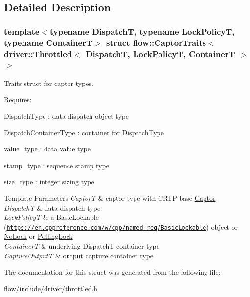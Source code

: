 \subsection{Detailed Description}
\subsubsection*{template$<$typename DispatchT, typename Lock\+PolicyT, typename ContainerT$>$\newline
struct flow\+::\+Captor\+Traits$<$ driver\+::\+Throttled$<$ Dispatch\+T, Lock\+Policy\+T, Container\+T $>$ $>$}

Traits struct for captor types. 

Requires\+:
\begin{DoxyItemize}
\item {\ttfamily Dispatch\+Type} \+: data dispatch object type
\item {\ttfamily Dispatch\+Container\+Type} \+: container for {\ttfamily Dispatch\+Type}
\item {\ttfamily value\+\_\+type} \+: data value type
\item {\ttfamily stamp\+\_\+type} \+: sequence stamp type
\item {\ttfamily size\+\_\+type} \+: integer sizing type
\end{DoxyItemize}


\begin{DoxyTemplParams}{Template Parameters}
{\em CaptorT} & captor type with C\+R\+TP base {\ttfamily \hyperlink{classflow_1_1_captor}{Captor}}\\
\hline
{\em DispatchT} & data dispatch type \\
\hline
{\em Lock\+PolicyT} & a Basic\+Lockable (\href{https://en.cppreference.com/w/cpp/named_req/BasicLockable}{\tt https\+://en.\+cppreference.\+com/w/cpp/named\+\_\+req/\+Basic\+Lockable}) object or \hyperlink{structflow_1_1_no_lock}{No\+Lock} or \hyperlink{structflow_1_1_polling_lock}{Polling\+Lock} \\
\hline
{\em ContainerT} & underlying {\ttfamily DispatchT} container type \\
\hline
{\em Capture\+OutputT} & output capture container type \\
\hline
\end{DoxyTemplParams}


The documentation for this struct was generated from the following file\+:\begin{DoxyCompactItemize}
\item 
flow/include/driver/throttled.\+h\end{DoxyCompactItemize}
